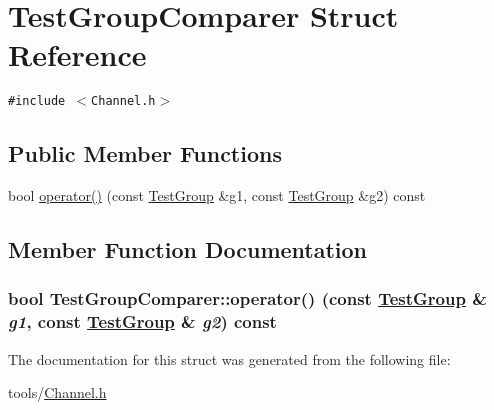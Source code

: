 \hypertarget{struct_test_group_comparer}{
\section{Test\-Group\-Comparer Struct Reference}
\label{struct_test_group_comparer}
}
{\tt \#include $<$Channel.h$>$}

\subsection*{Public Member Functions}
\begin{CompactItemize}
\item 
bool \hyperlink{struct_test_group_comparer_f1d4d79824e65c08f7e063f6d09eb755}{operator()} (const \hyperlink{struct_test_group}{Test\-Group} \&g1, const \hyperlink{struct_test_group}{Test\-Group} \&g2) const 
\end{CompactItemize}


\subsection{Member Function Documentation}
\hypertarget{struct_test_group_comparer_f1d4d79824e65c08f7e063f6d09eb755}{
\subsubsection[operator()]{\setlength{\rightskip}{0pt plus 5cm}bool Test\-Group\-Comparer::operator() (const \hyperlink{struct_test_group}{Test\-Group} \& {\em g1}, const \hyperlink{struct_test_group}{Test\-Group} \& {\em g2}) const}}
\label{struct_test_group_comparer_f1d4d79824e65c08f7e063f6d09eb755}




The documentation for this struct was generated from the following file:\begin{CompactItemize}
\item 
tools/\hyperlink{_channel_8h}{Channel.h}\end{CompactItemize}

